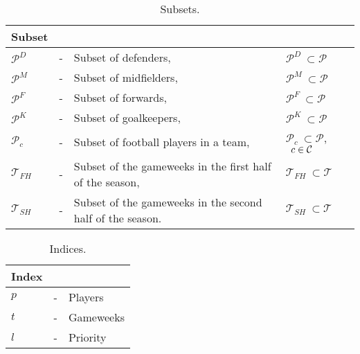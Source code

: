 \begin{table}[H]
\centering
\caption{Subsets.}
\begin{tabular}{@{}llll@{}}
\toprule
Subset            &   &                                       &                                                 \\ 
\midrule
$\mathcal{P}^{D}$ & - & Subset of defenders,                  & \quad  $\mathcal{P}^{D} \ \subset \mathcal{P}$  \\
$\mathcal{P}^{M}$ & - & Subset of midfielders,                & \quad $\mathcal{P}^{M} \ \subset \mathcal{P}$   \\
$\mathcal{P}^{F}$ & - & Subset of forwards,                   & \quad $\mathcal{P}^{F} \ \subset \mathcal{P}$   \\
$\mathcal{P}^{K}$ & - & Subset of goalkeepers,                & \quad $\mathcal{P}^{K} \ \subset \mathcal{P}$   \\
$\mathcal{P}_{c}$ & - & Subset of football players in a team, & \quad $\mathcal{P}_{c} \ \subset \mathcal{P}$, $\enskip c \in \mathcal{C}$  \\ 
$\mathcal{T}_{FH}$ & - & Subset of the gameweeks in the first half of the season,                & \quad $\mathcal{T}_{FH} \ \subset \mathcal{T}$   \\
$\mathcal{T}_{SH}$ & - & Subset of the gameweeks in the second half of the season.                & \quad $\mathcal{T}_{SH} \ \subset \mathcal{T}$   \\
\bottomrule
\end{tabular}
\end{table}


\begin{table}[H]
\centering
\caption{Indices.}
\begin{tabular}{@{}lll@{}}
\toprule
Index &   &           \\ \midrule
$p$   & - & Players   \\
$t$   & - & Gameweeks \\
$l$   & - & Priority  \\ \bottomrule
\end{tabular}
\end{table}


